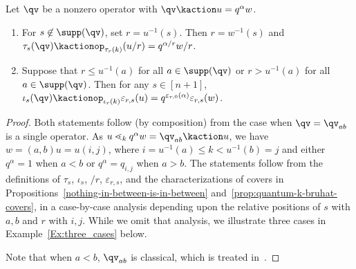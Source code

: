 \begin{lemma}\label{L:relative-labels}
  Let $\qv$ be a nonzero operator with $\qv\kaction u=q^\alpha w$.
  \begin{enumerate}[label=(\roman*)]
  \item\label{L:r-l:i}
    For $s\not\in\supp(\qv)$, set $r=u^{-1}(s)$.
    Then $r=w^{-1}(s)$ and $\tau_s(\qv) {\kactionop}_{\tau_r(k)} (u/r) = q^{\alpha/r} w/r$.
  \item \label{L:r-l:ii}
    Suppose that $r\leq u^{-1}(a)$ for all $a\in\supp(\qv)$ or $r>u^{-1}(a)$ for all $a\in\supp(\qv)$.
    Then for any $s\in[n{+}1]$, $\iota_s(\qv)\kactionop_{\iota_r(k)} \varepsilon_{r,s}(u) = q^{\varepsilon_{r,0}(\alpha)}\varepsilon_{r,s}(w)$.
  \end{enumerate}
\end{lemma}

\begin{proof}
  Both statements follow (by composition) from the case when $\qv=\qv_{ab}$ is a single operator.
  As $u\lessdot_k q^\alpha w=\qv_{ab}\kaction u$, we have
  $w=(a,b)u=u(i,j)$, where $i=u^{-1}(a)\leq k < u^{-1}(b)=j$ and either $q^\alpha=1$ when $a<b$ or $q^\alpha=q_{i,j}$ when $a>b$.
  The statements follow from the definitions of $\tau_s$, $\iota_s$, $/r$, $\varepsilon_{r,s}$, and the
  characterizations of covers in Propositions~\ref{nothing-in-between-is-in-between} and~\ref{prop:quantum-k-bruhat-covers}, in a
  case-by-case analysis depending upon the relative positions of $s$ with $a,b$ and $r$ with $i,j$.
  While we omit that analysis, we illustrate three cases in Example~\ref{Ex:three_cases} below.

  Note that when $a<b$, $\qv_{ab}$ is classical, which is treated in~\cite{BS-Bruhat,BS-Monoid}.
\end{proof}

